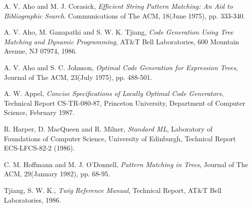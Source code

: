 \begin{thebibliography}{99}

 {\sc A. V. Aho and M. J. Corasick},
{\em Efficient String Pattern Matching: An Aid to Bibliographic Search}.
Communications of The ACM, 18(June 1975), pp. 333-340.

 {\sc A. V. Aho, M. Ganapathi and S. W. K.
Tjiang}, {\em Code Generation Using Tree Matching and Dynamic Programming},
AT\&T Bell Laboratories, 600 Mountain Avenue, NJ 07974, 1986.

 {\sc A. V. Aho and S. C. Johnson}, {\em Optimal Code
Generation for Expression Trees}, Journal of The ACM, 23(July 1975),
pp. 488-501.

 {\sc A. W. Appel}, {\em Concise Specifications of Locally
Optimal Code Generators}, Technical Report CS-TR-080-87, Princeton
University, Department of Computer Science, February 1987.

 {\sc R. Harper, D. MacQueen and R. Milner},
{\em Standard ML}, Laboratory of Foundations of Computer Science,
University of Edinburgh, Technical Report ECS-LFCS-82-2 (1986).

 {\sc C. M. Hoffmann and M. J. O'Donnell},
{\em Pattern Matching in Trees}, Journal of The ACM, 29(January 1982),
pp. 68-95.

 {\sc Tjiang, S. W. K.}, {\em Twig Reference Manual},
Technical Report, AT\&T Bell Laboratories, 1986.

\end{thebibliography}


